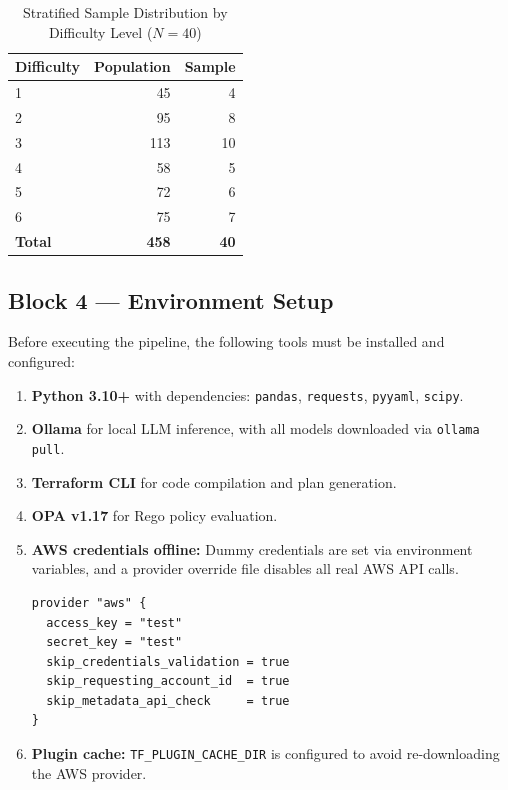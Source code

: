 \begin{table}[htbp]
\centering
\caption{Stratified Sample Distribution by Difficulty Level ($N=40$)}
\label{tab:sample_dist}
\begin{tabular}{@{}lrr@{}}
\toprule
\textbf{Difficulty} & \textbf{Population} & \textbf{Sample} \\
\midrule
1 & 45  & 4  \\
2 & 95  & 8  \\
3 & 113 & 10 \\
4 & 58  & 5  \\
5 & 72  & 6  \\
6 & 75  & 7  \\
\midrule
\textbf{Total} & \textbf{458} & \textbf{40} \\
\bottomrule
\end{tabular}
\end{table}

\subsection{Block 4 --- Environment Setup}
\label{sec:block4}

Before executing the pipeline, the following tools must be installed
and configured:

\begin{enumerate}[leftmargin=*]
    \item \textbf{Python 3.10+} with dependencies: \texttt{pandas},
          \texttt{requests}, \texttt{pyyaml}, \texttt{scipy}.
    \item \textbf{Ollama} for local LLM inference, with all models
          downloaded via \texttt{ollama pull}.
    \item \textbf{Terraform CLI} for code compilation and plan
          generation.
    \item \textbf{OPA v1.17} for Rego policy evaluation.
    \item \textbf{AWS credentials offline:} Dummy credentials are
          set via environment variables, and a provider override file
          disables all real AWS API calls.
\begin{verbatim}
provider "aws" {
  access_key = "test"
  secret_key = "test"
  skip_credentials_validation = true
  skip_requesting_account_id  = true
  skip_metadata_api_check     = true
}
\end{verbatim}
    \item \textbf{Plugin cache:} \texttt{TF\_PLUGIN\_CACHE\_DIR} is
          configured to avoid re-downloading the AWS provider.
\end{enumerate}

